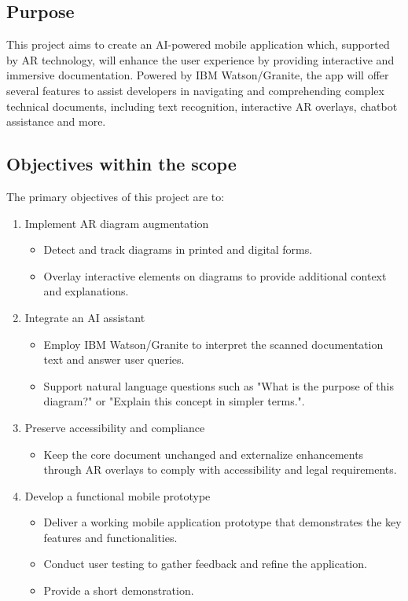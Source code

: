 \documentclass[12pt]{article}
\begin{document}
    \subsection{Purpose}
    This project aims to create an AI-powered mobile application which, supported by AR technology, will enhance the user experience
    by providing interactive and immersive documentation. Powered by IBM Watson/Granite, the app will offer several features to assist developers in navigating and comprehending complex technical documents, including text recognition,
    interactive AR overlays, chatbot assistance and more.

    \subsection{Objectives within the scope}
    The primary objectives of this project are to:
    \begin{enumerate}
        \item Implement AR diagram augmentation
        \begin{itemize}
            \item Detect and track diagrams in printed and digital forms.
            \item Overlay interactive elements on diagrams to provide additional context and explanations.
        \end{itemize}
        \item Integrate an AI assistant
        \begin{itemize}
            	\item Employ IBM Watson/Granite to interpret the scanned documentation text and answer user queries.
            	\item Support natural language questions such as "What is the purpose of this diagram?" or "Explain this concept in simpler terms.".
        \end{itemize}
    \item Preserve accessibility and compliance
        \begin{itemize}
            \item Keep the core document unchanged and externalize enhancements through AR overlays to comply with accessibility and legal requirements.
        \end{itemize}
        \item Develop a functional mobile prototype
        \begin{itemize}
            \item Deliver a working mobile application prototype that demonstrates the key features and functionalities.
            \item Conduct user testing to gather feedback and refine the application.
            \item Provide a short demonstration.
        \end{itemize}
        \end{enumerate}
\end{document}

